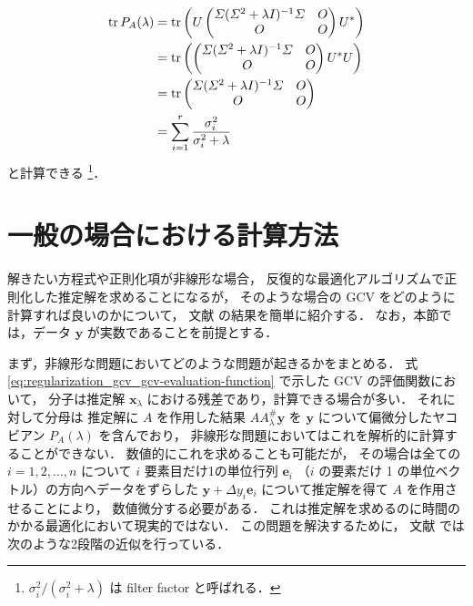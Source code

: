 \begin{align}
    \operatorname{tr}{P_A(\lambda)}
     & = \operatorname{tr}\left(U
    \begin{pmatrix}
            \varSigma (\varSigma^2 + \lambda I)^{-1} \varSigma & O \\
            O                                         & O
        \end{pmatrix}
    U^*\right)
    \notag                                                      \\
     & = \operatorname{tr}\left(
    \begin{pmatrix}
            \varSigma (\varSigma^2 + \lambda I)^{-1} \varSigma & O \\
            O                                         & O
        \end{pmatrix}
    U^* U\right)
    \notag                                                      \\
     & = \operatorname{tr}
    \begin{pmatrix}
        \varSigma (\varSigma^2 + \lambda I)^{-1} \varSigma & O \\
        O                                         & O
    \end{pmatrix}
    \notag                                                      \\
     & = \sum_{i = 1}^r \frac{\sigma_i^2}{\sigma_i^2 + \lambda}
\end{align}
と計算できる
\cite{Hansen1998}
\footnote{$\sigma_i^2 / (\sigma_i^2 + \lambda)$ は filter factor と呼ばれる．}．

\section{一般の場合における計算方法}

解きたい方程式や正則化項が非線形な場合，
反復的な最適化アルゴリズムで正則化した推定解を求めることになるが，
そのような場合の GCV をどのように計算すれば良いのかについて，
文献 \cite{Deshpande1991} の結果を簡単に紹介する．
なお，本節では，データ $\bm{y}$ が実数であることを前提とする．

まず，非線形な問題においてどのような問題が起きるかをまとめる．
式 \eqref{eq:regularization_gcv_gcv-evaluation-function} で示した GCV の評価関数において，
分子は推定解 $\bm{x}_\lambda$ における残差であり，計算できる場合が多い．
それに対して分母は
推定解に $A$ を作用した結果 $A A_\lambda^\#\bm{y}$ を
$\bm{y}$ について偏微分したヤコビアン $P_A(\lambda)$ を含んでおり，
非線形な問題においてはこれを解析的に計算することができない．
数値的にこれを求めることも可能だが，
その場合は全ての $i=1, 2, \ldots, n$ について
$i$ 要素目だけ1の単位行列 $\bm{e}_i$ （$i$ の要素だけ 1 の単位ベクトル）の方向へデータをずらした
$\bm{y} + \Delta y_i \bm{e}_i$ について推定解を得て
$A$ を作用させることにより，
数値微分する必要がある．
これは推定解を求めるのに時間のかかる最適化において現実的ではない．
この問題を解決するために，
文献 \cite{Deshpande1991} では次のような2段階の近似を行っている．

